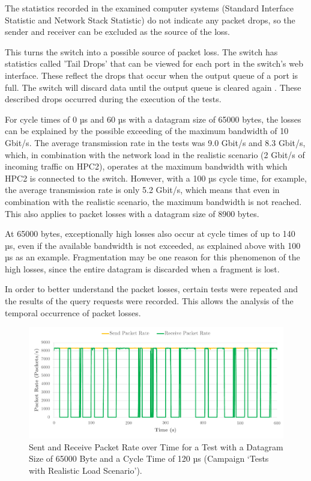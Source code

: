 The statistics recorded in the examined computer systems (Standard Interface Statistic and Network Stack Statistic) do not indicate any packet drops, so the sender and receiver can be excluded as the source of the loss.

This turns the switch into a possible source of packet loss. The switch has statistics called 'Tail Drops' that can be viewed for each port in the switch's web interface. These reflect the drops that occur when the output queue of a port is full. The switch will discard data until the output queue is cleared again \cite {reli02}. These described drops occurred during the execution of the tests.

For cycle times of 0 µs and 60 µs with a datagram size of 65000 bytes, the losses can be explained by the possible exceeding of the maximum bandwidth of 10 Gbit/s. The average transmission rate in the tests was 9.0 Gbit/s and 8.3 Gbit/s, which, in combination with the network load in the realistic scenario (2 Gbit/s of incoming traffic on HPC2), operates at the maximum bandwidth with which HPC2 is connected to the switch. However, with a 100 µs cycle time, for example, the average transmission rate is only 5.2 Gbit/s, which means that even in combination with the realistic scenario, the maximum bandwidth is not reached. This also applies to packet losses with a datagram size of 8900 bytes.

At 65000 bytes, exceptionally high losses also occur at cycle times of up to 140 µs, even if the available bandwidth is not exceeded, as explained above with 100 µs as an example. Fragmentation may be one reason for this phenomenon of the high losses, since the entire datagram is discarded when a fragment is lost.

In order to better understand the packet losses, certain tests were repeated and the results of the query requests were recorded. This allows the analysis of the temporal occurrence of packet losses.

\begin{figure}[h!]
    \centering
    \includegraphics[width=1\linewidth]{figures/reliability/star/rel_d_4.pdf}
    \caption{Sent and Receive Packet Rate over Time for a Test with a Datagram Size of 65000 Byte and a Cycle Time of 120 µs (Campaign `Tests with Realistic Load Scenario').}
    \label{fig:srpr4}
\end{figure}

